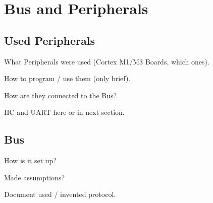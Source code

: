 \section{Bus and Peripherals}

\subsection{Used Peripherals}

What Peripherals were used (Cortex M1/M3 Boards, which ones).

How to program / use them (only brief).

How are they connected to the Bus?

IIC and UART here or in next section.

\subsection{Bus}

How is it set up?

Made assumptions?

Document used / invented protocol.

